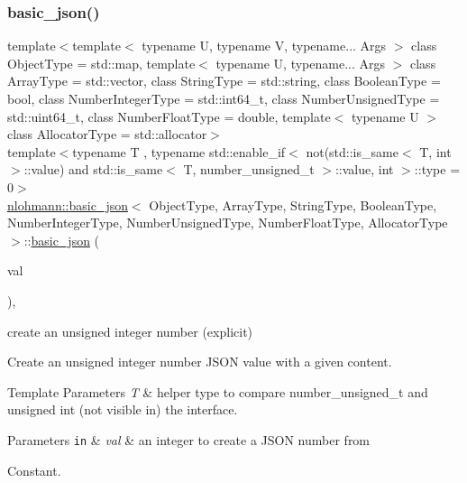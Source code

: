 \subsubsection{\texorpdfstring{basic\+\_\+json()}{basic\_json()}\hspace{0.1cm}{\footnotesize\ttfamily [14/23]}}
{\footnotesize\ttfamily template$<$template$<$ typename U, typename V, typename... Args $>$ class Object\+Type = std\+::map, template$<$ typename U, typename... Args $>$ class Array\+Type = std\+::vector, class String\+Type  = std\+::string, class Boolean\+Type  = bool, class Number\+Integer\+Type  = std\+::int64\+\_\+t, class Number\+Unsigned\+Type  = std\+::uint64\+\_\+t, class Number\+Float\+Type  = double, template$<$ typename U $>$ class Allocator\+Type = std\+::allocator$>$ \\
template$<$typename T , typename std\+::enable\+\_\+if$<$ not(std\+::is\+\_\+same$<$ T, int $>$\+::value) and std\+::is\+\_\+same$<$ T, number\+\_\+unsigned\+\_\+t $>$\+::value, int $>$\+::type  = 0$>$ \\
\hyperlink{classnlohmann_1_1basic__json}{nlohmann\+::basic\+\_\+json}$<$ Object\+Type, Array\+Type, String\+Type, Boolean\+Type, Number\+Integer\+Type, Number\+Unsigned\+Type, Number\+Float\+Type, Allocator\+Type $>$\+::\hyperlink{classnlohmann_1_1basic__json}{basic\+\_\+json} (\begin{DoxyParamCaption}\item[{const \hyperlink{classnlohmann_1_1basic__json_a60a04166c122072ab11eaf9845d9cd1d}{number\+\_\+unsigned\+\_\+t}}]{val }\end{DoxyParamCaption})\hspace{0.3cm}{\ttfamily [inline]}, {\ttfamily [noexcept]}}



create an unsigned integer number (explicit) 

Create an unsigned integer number J\+S\+ON value with a given content.


\begin{DoxyTemplParams}{Template Parameters}
{\em T} & helper type to compare number\+\_\+unsigned\+\_\+t and unsigned int (not visible in) the interface.\\
\hline
\end{DoxyTemplParams}

\begin{DoxyParams}[1]{Parameters}
\mbox{\tt in}  & {\em val} & an integer to create a J\+S\+ON number from\\
\hline
\end{DoxyParams}
Constant.


